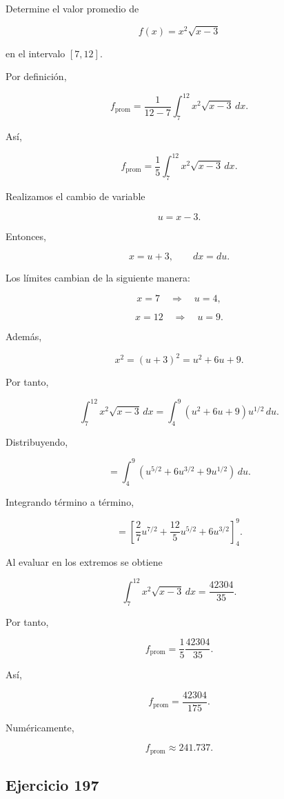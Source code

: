 \documentclass[12pt]{article}
\begin{document}
Determine el valor promedio de

\[
f(x)=x^2\sqrt{x-3}
\]

en el intervalo \([7,12]\).

Por definición,

\[
f_{\mathrm{prom}}
=
\frac{1}{12-7}
\int_7^{12}x^2\sqrt{x-3}\,dx.
\]

Así,

\[
f_{\mathrm{prom}}
=
\frac15
\int_7^{12}x^2\sqrt{x-3}\,dx.
\]

Realizamos el cambio de variable

\[
u=x-3.
\]

Entonces,

\[
x=u+3,
\qquad
dx=du.
\]

Los límites cambian de la siguiente manera:

\[
x=7
\quad\Longrightarrow\quad
u=4,
\]

\[
x=12
\quad\Longrightarrow\quad
u=9.
\]

Además,

\[
x^2=(u+3)^2=u^2+6u+9.
\]

Por tanto,

\[
\int_7^{12}x^2\sqrt{x-3}\,dx
=
\int_4^9
(u^2+6u+9)u^{1/2}\,du.
\]

Distribuyendo,

\[
=
\int_4^9
\left(
u^{5/2}
+6u^{3/2}
+9u^{1/2}
\right)\,du.
\]

Integrando término a término,

\[
=
\left[
\frac{2}{7}u^{7/2}
+
\frac{12}{5}u^{5/2}
+
6u^{3/2}
\right]_4^9.
\]

Al evaluar en los extremos se obtiene

\[
\int_7^{12}x^2\sqrt{x-3}\,dx
=
\frac{42304}{35}.
\]

Por tanto,

\[
f_{\mathrm{prom}}
=
\frac15
\frac{42304}{35}.
\]

Así,

\[
\boxed{
f_{\mathrm{prom}}
=
\frac{42304}{175}
}.
\]

Numéricamente,

\[
\boxed{
f_{\mathrm{prom}}\approx241.737
}.
\]

\subsection*{Ejercicio 197}
\end{document}
